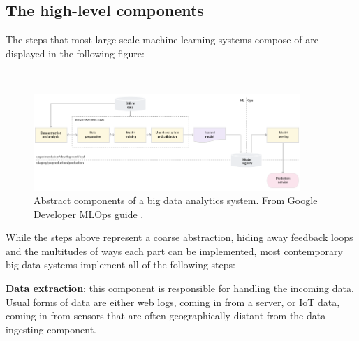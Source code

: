 

\subsection{The high-level components}



The steps that most large-scale machine learning systems compose of are displayed in the following figure: 

\begin{figure}[ht]
\ \newline
\begin{center}
\includegraphics[width=0.9\textwidth]{simplegoogle.png}
\caption{Abstract components of a big data analytics system. From Google Developer MLOps guide \cite{googlemlops}.}
\label{simplepipeline}
\end{center}
\end{figure}


While the steps above represent a coarse abstraction, hiding away feedback loops and the multitudes of ways each part can be implemented, most contemporary big data systems implement all of the following steps:

\textbf{Data extraction}: this component is responsible for handling the incoming data. Usual forms of data are either web logs, coming in from a server, or IoT data, coming in from sensors that are often geographically distant from the data ingesting component.

